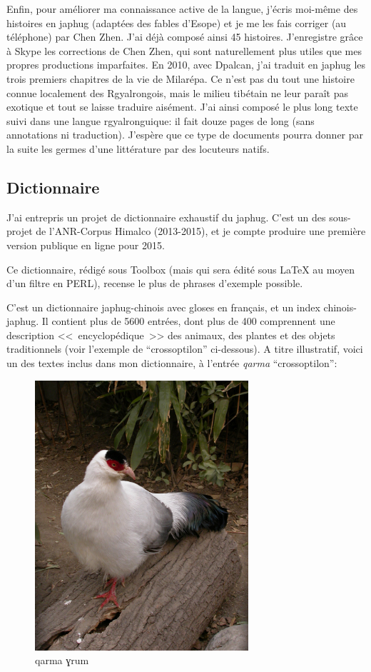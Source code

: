 \documentclass[oldfontcommands,oneside,a4paper,11pt]{memoir}
\begin{document}
Enfin, pour améliorer ma connaissance active de la langue, j'écris moi-même des histoires en japhug (adaptées des fables d'Esope) et je me les fais corriger (au téléphone) par Chen Zhen. J'ai déjà composé ainsi 45 histoires. J'enregistre  grâce à Skype les corrections de Chen Zhen, qui sont naturellement plus utiles que mes propres productions imparfaites. En 2010, avec Dpalcan, j'ai traduit en japhug les trois premiers chapitres de la vie de Milarépa. Ce n'est pas du tout une histoire connue localement des Rgyalrongois, mais le milieu tibétain ne leur paraît pas exotique et tout se laisse traduire aisément. J'ai ainsi composé le plus long texte suivi dans une langue rgyalronguique: il fait douze pages de long (sans annotations ni traduction). J'espère que ce type de documents pourra donner par la suite les germes d'une littérature par des locuteurs natifs.

	
\subsection{Dictionnaire} \label{dico}
J'ai entrepris un projet de dictionnaire exhaustif du japhug. C'est un des sous-projet de l'ANR-Corpus Himalco (2013-2015), et je compte produire une première version publique en ligne pour 2015.

Ce dictionnaire, rédigé sous Toolbox (mais qui sera édité sous {\LaTeX} au moyen d'un filtre en PERL), recense le plus de phrases d'exemple possible. 


C'est un dictionnaire japhug-chinois avec gloses en français, et un index chinois-japhug. Il contient plus de 5600 entrées, dont plus de 400 comprennent une description <<~encyclopédique~>> des animaux, des plantes et des objets traditionnels (voir l'exemple de ``crossoptilon'' ci-dessous).   A titre illustratif, voici un des textes inclus dans mon dictionnaire, à l'entrée \textit{qarma} ``crossoptilon'':

\begin{figure}[H]
\centering
\includegraphics[height=100mm]{WhiteEaredPheasant.jpg}
\caption{qarma ɣrum}
\label{fig:rgyalrong}
\end{figure}
\end{document}

